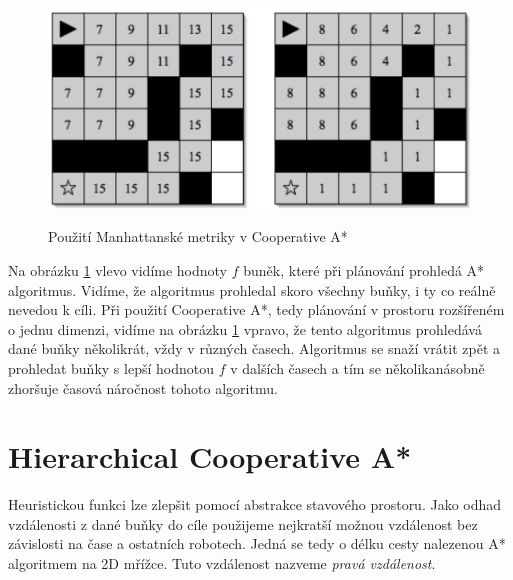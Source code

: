 \begin{figure}[htb]
	\begin{center}
		\includegraphics*[width=15cm,height=6cm,keepaspectratio]{obr/coopManh}
	\end{center}
	\caption[caption]{Použití Manhattanské metriky v Cooperative A* \cite{Silver2006}}
	\label{obr:coopManh}
\end{figure}

Na obrázku \ref{obr:coopManh} vlevo vidíme hodnoty $f$ buněk, které při plánování prohledá A* algoritmus. Vidíme, že algoritmus prohledal skoro všechny buňky, i ty co reálně nevedou k cíli. Při použití Cooperative A*, tedy plánování v prostoru rozšířeném o jednu dimenzi, vidíme na obrázku \ref{obr:coopManh} vpravo, že tento algoritmus prohledává dané buňky několikrát, vždy v různých časech. Algoritmus se snaží vrátit zpět a prohledat buňky s lepší hodnotou $f$ v dalších časech a tím se několikanásobně zhoršuje časová náročnost tohoto algoritmu.

\section{Hierarchical Cooperative A*}\label{sec:HCA}


Heuristickou funkci lze zlepšit pomocí abstrakce stavového prostoru.  Jako odhad vzdálenosti z dané buňky do cíle použijeme nejkratší možnou vzdálenost bez závislosti na čase a ostatních robotech. Jedná se tedy o délku cesty nalezenou A* algoritmem na 2D mřížce. Tuto vzdálenost nazveme \emph{pravá vzdálenost}.

